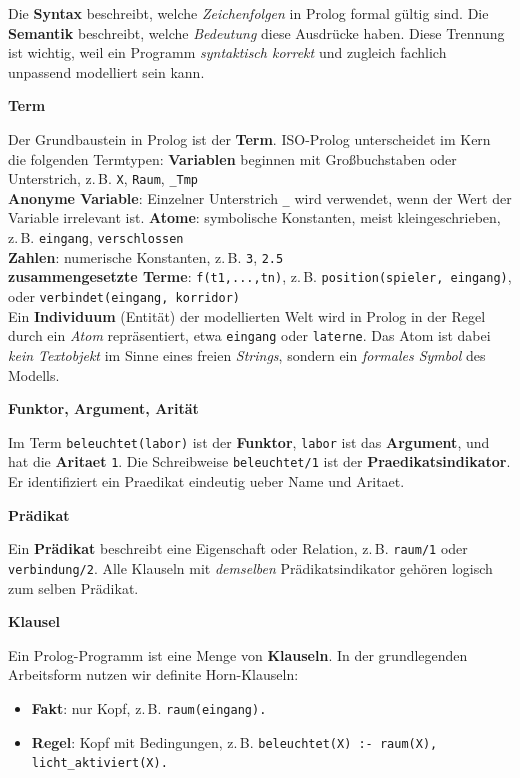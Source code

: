 \documentclass[parskip=half,a4paper,11pt]{scrreprt}
\begin{document}
Die \textbf{Syntax} beschreibt, welche\textit{ Zeichenfolgen} in Prolog formal gültig sind. Die \textbf{Semantik} beschreibt, welche \textit{Bedeutung} diese Ausdrücke haben. Diese Trennung ist wichtig, weil ein Programm \textit{syntaktisch korrekt} und zugleich fachlich unpassend modelliert sein kann.

\textbf{Term}

Der Grundbaustein in Prolog ist der \textbf{Term}. ISO-Prolog unterscheidet im Kern die folgenden Termtypen:
\textbf{
Variablen} beginnen mit Großbuchstaben oder Unterstrich, z.\,B. \texttt{X}, \texttt{Raum}, \texttt{\_Tmp}\\
\textbf{Anonyme Variable}: Einzelner Unterstrich \verb|_| wird  verwendet, wenn der Wert der Variable irrelevant ist.
\textbf{Atome}: symbolische Konstanten, meist kleingeschrieben, z.\,B. \texttt{eingang}, \texttt{verschlossen}\\
\textbf{Zahlen}: numerische Konstanten, z.\,B. \texttt{3}, \texttt{2.5}\\
\textbf{zusammengesetzte Terme}: \texttt{f(t1,...,tn)}, z.\,B. \texttt{position(spieler, eingang)}, oder \texttt{verbindet(eingang, korridor)}\\

Ein \textbf{Individuum} (Entität) der modellierten Welt wird in Prolog in der Regel durch ein \textit{Atom} repräsentiert, etwa \texttt{eingang} oder \texttt{laterne}. Das Atom ist dabei \textit{kein Textobjekt} im Sinne eines freien \textit{Strings}, sondern ein \textit{formales Symbol} des Modells.

\textbf{Funktor, Argument, Arität}

Im Term \texttt{beleuchtet(labor)} ist  der \textbf{Funktor}, \texttt{labor} ist das \textbf{Argument}, und hat die \textbf{Aritaet} \texttt{1}. Die Schreibweise \texttt{beleuchtet/1} ist der \textbf{Praedikatsindikator}. Er identifiziert ein Praedikat eindeutig ueber Name und Aritaet.

\textbf{Prädikat}

Ein \textbf{Prädikat} beschreibt eine Eigenschaft oder Relation, z.\,B. \texttt{raum/1} oder \texttt{verbindung/2}. Alle Klauseln mit \textit{demselben} Prädikatsindikator gehören logisch zum selben Prädikat.

\textbf{Klausel}

Ein Prolog-Programm ist eine Menge von \textbf{Klauseln}. In der grundlegenden Arbeitsform nutzen wir definite Horn-Klauseln:

\begin{itemize}
    \item \textbf{Fakt}: nur Kopf, z.\,B. \texttt{raum(eingang).}
    \item \textbf{Regel}: Kopf mit Bedingungen, z.\,B. \texttt{beleuchtet(X) :- raum(X), licht\_aktiviert(X).}
\end{itemize}
\end{document}
